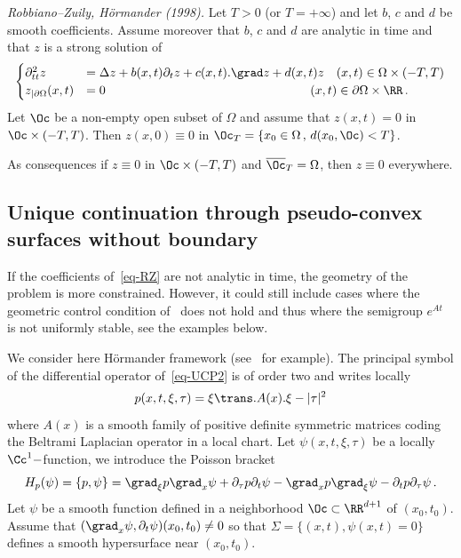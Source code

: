 \begin{theo}\label{th-RZ}
{\emph{Robbiano--Zuily, H\"ormander (1998).}}
Let $T>0$ (or $T=+\infty$) and let $b$, $c$ and $d$ be smooth coefficients. Assume moreover that $b$, $c$ and $d$ are analytic in time and that $z$ is a strong solution of
\begin{equation}\label{eq-RZ}
\begin{cases}
\partial^2_{tt} z &=\Delta z + b(x,t)\partial_t z+c(x,t).\grad z+d(x,t)z\quad(x,t)\in\Omega\times (-T,T)\\
z_{|\partial\Omega}(x,t)&= 0\mkern298mu(x,t)\in\partial\Omega\times \RR\,.
\end{cases}
\end{equation}
Let $\Oc$ be a non-empty open subset of $\Omega$ and assume that $z(x,t)=0$ in $\Oc\times (-T,T)$. Then $z(x,0)\equiv 0$ in $\Oc_T=\{x_0\in\Omega\,,\,d(x_0,\Oc)<T\}$.

As consequences if $z\equiv 0$ in $\Oc\times (-T,T)$ and $\overline
\Oc_T=\Omega$, then $z\equiv 0$ everywhere.
\end{theo}



\subsection{Unique continuation through pseudo-convex surfaces without boundary}\label{subsectUCPwithout}
If the coefficients of~\eqref{eq-RZ} are not analytic in time, the geometry of the problem is more constrained. However, it could still include cases where the geometric control condition of~\cite{BLR} does not hold and thus where the semigroup $e^{At}$ is not uniformly stable, see the examples below.

We consider here H\"ormander framework (see~\cite{Hormander} for example). The principal symbol of the differential operator of~\eqref{eq-UCP2} is of order two and writes locally
\[
p(x,t,\xi,\tau)=\xi\trans.A(x).\xi-|\tau|^2
\]
where $A(x)$ is a smooth family of positive definite symmetric matrices coding the Beltrami Laplacian operator in a local chart. Let $\psi(x,t,\xi,\tau)$ be a locally $\Cc^1-$function, we introduce the Poisson bracket
\[
H_p(\psi)=\{p,\psi\}= \grad_\xi p \grad_x \psi + \partial_\tau p \partial_t
\psi - \grad_x p \grad_\xi \psi - \partial_t p \partial_\tau \psi\,.
\]
Let $\psi$ be a smooth function defined in a neighborhood $\Oc\subset
\RR^{d+1}$ of $(x_0,t_0)$. Assume that $(\grad_x \psi,\partial_t
\psi)(x_0,t_0)\neq 0$ so that $\Sigma=\{(x,t),\psi(x,t)=0\}$ defines a smooth hypersurface near $(x_0,t_0)$.

